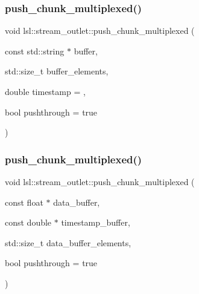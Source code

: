 \mbox{\label{classlsl_1_1stream__outlet_a2b4da4c1a2c3c47f39ed8a3f2cc717a5}} 
\subsubsection{\texorpdfstring{push\+\_\+chunk\+\_\+multiplexed()}{push\_chunk\_multiplexed()}\hspace{0.1cm}{\footnotesize\ttfamily [21/28]}}
{\footnotesize\ttfamily void lsl\+::stream\+\_\+outlet\+::push\+\_\+chunk\+\_\+multiplexed (\begin{DoxyParamCaption}\item[{const std\+::string $\ast$}]{buffer,  }\item[{std\+::size\+\_\+t}]{buffer\+\_\+elements,  }\item[{double}]{timestamp = {},  }\item[{bool}]{pushthrough = {\ttfamily true} }\end{DoxyParamCaption})\hspace{0.3cm}{\ttfamily [inline]}}

\mbox{\label{classlsl_1_1stream__outlet_a4cc12f447c2ccfe67a118a3c23215f0d}} 
\subsubsection{\texorpdfstring{push\+\_\+chunk\+\_\+multiplexed()}{push\_chunk\_multiplexed()}\hspace{0.1cm}{\footnotesize\ttfamily [22/28]}}
{\footnotesize\ttfamily void lsl\+::stream\+\_\+outlet\+::push\+\_\+chunk\+\_\+multiplexed (\begin{DoxyParamCaption}\item[{const float $\ast$}]{data\+\_\+buffer,  }\item[{const double $\ast$}]{timestamp\+\_\+buffer,  }\item[{std\+::size\+\_\+t}]{data\+\_\+buffer\+\_\+elements,  }\item[{bool}]{pushthrough = {\ttfamily true} }\end{DoxyParamCaption})\hspace{0.3cm}{\ttfamily [inline]}}

